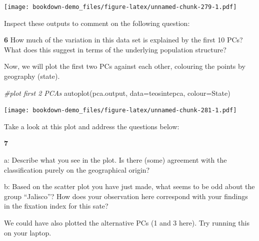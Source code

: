 \documentclass[
]{book}
\makeatletter
\newenvironment{Shaded}{\begin{snugshade}}{\end{snugshade}}
\newcommand{\AttributeTok}[1]{\textcolor[rgb]{0.77,0.63,0.00}{#1}}
\newcommand{\CommentTok}[1]{\textcolor[rgb]{0.56,0.35,0.01}{\textit{#1}}}
\newcommand{\FunctionTok}[1]{\textcolor[rgb]{0.00,0.00,0.00}{#1}}
\newcommand{\NormalTok}[1]{#1}
\newcommand{\StringTok}[1]{\textcolor[rgb]{0.31,0.60,0.02}{#1}}
\newenvironment{kframe}{%
\medskip{}
\setlength{\fboxsep}{.8em}
 \def\at@end@of@kframe{}%
 \ifinner\ifhmode%
  \def\at@end@of@kframe{\end{minipage}}%
  \begin{minipage}{\columnwidth}%
 \fi\fi%
 \def\FrameCommand##1{\hskip\@totalleftmargin \hskip-\fboxsep
 \colorbox{shadecolor}{##1}\hskip-\fboxsep
     \hskip-\linewidth \hskip-\@totalleftmargin \hskip\columnwidth}%
 \MakeFramed {\advance\hsize-\width
   \@totalleftmargin\z@ \linewidth\hsize
   \@setminipage}}%
 {\par\unskip\endMakeFramed%
 \at@end@of@kframe}
\newenvironment{rmdblock}[1]
  {
  \begin{itemize}
  \renewcommand{\labelitemi}{
    \raisebox{-.7\height}[0pt][0pt]{
      {\setkeys{Gin}{width=3em,keepaspectratio}\texttt{[image: images/\#1]}}
    }
  }
  \setlength{\fboxsep}{1em}
  \begin{kframe}
  \item
  }
  {
  \end{kframe}
  \end{itemize}
  }
\newenvironment{rmdquiz}
  {\begin{rmdblock}{quiz}}
  {\end{rmdblock}}
\makeatother
\begin{document}
\texttt{[image: bookdown-demo\_files/figure-latex/unnamed-chunk-279-1.pdf]}

Inspect these outputs to comment on the following question:

\begin{rmdquiz}
\textbf{6} How much of the variation in this data set is explained by the first 10 PCs? What does this suggest in terms of the underlying population structure?
\end{rmdquiz}

Now, we will plot the first two PCs against each other, colouring the points by geography (state).

\begin{Shaded}
\begin{Highlighting}[]
\CommentTok{\#plot first 2 PCAs}
\FunctionTok{autoplot}\NormalTok{(pca.output, }\AttributeTok{data=}\NormalTok{teosintepca, }\AttributeTok{colour=}\StringTok{\textquotesingle{}State\textquotesingle{}}\NormalTok{)}
\end{Highlighting}
\end{Shaded}

\texttt{[image: bookdown-demo\_files/figure-latex/unnamed-chunk-281-1.pdf]}

Take a look at this plot and address the questions below:

\begin{rmdquiz}
\textbf{7}

a: Describe what you see in the plot. Is there (some) agreement with the classification purely on the geographical origin?

b: Based on the scatter plot you have just made, what seems to be odd about the group ``Jalisco''? How does your observation here correspond with your findings in the fixation index for this sate?
\end{rmdquiz}

We could have also plotted the alternative PCs (1 and 3 here). Try running this on your laptop.
\end{document}
